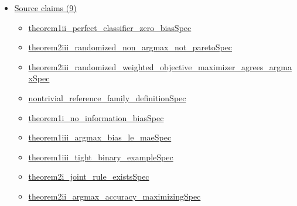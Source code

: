 \documentclass[10pt]{article}
\begin{document}
\begin{itemize}[leftmargin=1.2em]
\begin{itemize}[leftmargin=1.2em]
\item \hyperlink{paper-prerequisite-ce0ba7b00b93c0fc}{DSWG24\allowbreak{}Discretization\allowbreak{}Bias.\allowbreak{}Proof\allowbreak{}Bridge.\allowbreak{}maximizes\allowbreak{}Equation1}
\item \hyperlink{paper-prerequisite-b11323803f325211}{DSWG24\allowbreak{}Discretization\allowbreak{}Bias.\allowbreak{}Proof\allowbreak{}Bridge.\allowbreak{}posterior\allowbreak{}Simplex}
\item \hyperlink{paper-prerequisite-e9ff5dcccf634407}{DSWG24\allowbreak{}Discretization\allowbreak{}Bias.\allowbreak{}Proof\allowbreak{}Bridge.\allowbreak{}reference\allowbreak{}Simplex\allowbreak{}At}
\end{itemize}
\item \hyperlink{source-section-f10b5f68e4acf3dc}{Source claims (9)}
\begin{itemize}[leftmargin=1.2em]
\item \hyperlink{source-claim-1966e78967344232}{theorem1ii\_\allowbreak{}perfect\_\allowbreak{}classifier\_\allowbreak{}zero\_\allowbreak{}bias\allowbreak{}Spec}
\item \hyperlink{source-claim-61c8bcc1f7628e92}{theorem2iii\_\allowbreak{}randomized\_\allowbreak{}non\_\allowbreak{}argmax\_\allowbreak{}not\_\allowbreak{}pareto\allowbreak{}Spec}
\item \hyperlink{source-claim-1356bc033e8e977b}{theorem2iii\_\allowbreak{}randomized\_\allowbreak{}weighted\_\allowbreak{}objective\_\allowbreak{}maximizer\_\allowbreak{}agrees\_\allowbreak{}argmax\allowbreak{}Spec}
\item \hyperlink{source-claim-4662dc8e8bb960d7}{nontrivial\_\allowbreak{}reference\_\allowbreak{}family\_\allowbreak{}definition\allowbreak{}Spec}
\item \hyperlink{source-claim-861b407dcf52f582}{theorem1i\_\allowbreak{}no\_\allowbreak{}information\_\allowbreak{}bias\allowbreak{}Spec}
\item \hyperlink{source-claim-d8ad786b7cc58022}{theorem1iii\_\allowbreak{}argmax\_\allowbreak{}bias\_\allowbreak{}le\_\allowbreak{}mae\allowbreak{}Spec}
\item \hyperlink{source-claim-d6b9878258465151}{theorem1iii\_\allowbreak{}tight\_\allowbreak{}binary\_\allowbreak{}example\allowbreak{}Spec}
\item \hyperlink{source-claim-82ddd45159ec7ca3}{theorem2i\_\allowbreak{}joint\_\allowbreak{}rule\_\allowbreak{}exists\allowbreak{}Spec}
\item \hyperlink{source-claim-cc8ba41c41752422}{theorem2ii\_\allowbreak{}argmax\_\allowbreak{}accuracy\_\allowbreak{}maximizing\allowbreak{}Spec}
\end{itemize}
\end{itemize}
\end{document}
